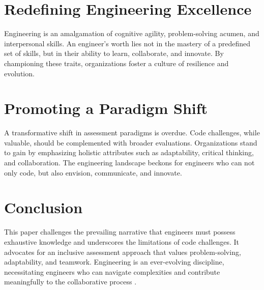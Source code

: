 \documentclass[
    a4paper, %
    10pt, %
    unnumberedsections, %
    twoside, %
]{LTJournalArticle}
\begin{document}

\section{Redefining Engineering Excellence}

Engineering is an amalgamation of cognitive agility, problem-solving acumen, and interpersonal skills. An engineer's worth lies not in the mastery of a predefined set of skills, but in their ability to learn, collaborate, and innovate. By championing these traits, organizations foster a culture of resilience and evolution.

\section{Promoting a Paradigm Shift}

A transformative shift in assessment paradigms is overdue. Code challenges, while valuable, should be complemented with broader evaluations. Organizations stand to gain by emphasizing holistic attributes such as adaptability, critical thinking, and collaboration. The engineering landscape beckons for engineers who can not only code, but also envision, communicate, and innovate.


\section{Conclusion}

This paper challenges the prevailing narrative that engineers must possess exhaustive knowledge and underscores the limitations of code challenges. It advocates for an inclusive assessment approach that values problem-solving, adaptability, and teamwork. Engineering is an ever-evolving discipline, necessitating engineers who can navigate complexities and contribute meaningfully to the collaborative process \cite{Smith2020,Johnson2019,Brown2021,Garcia2022}.


\printbibliography %

\end{document}
